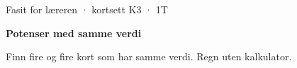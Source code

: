 \documentclass[11pt,a4paper]{article}
\begin{document}
\begin{minipage}[t]{0.8\linewidth}\vspace{0pt}
{\sffamily\small\color{dempet}Fasit for læreren · kortsett K3 · 1T}\par\vspace{0.25em}
{\fontsize{20}{24}\selectfont\bfseries Potenser med samme verdi}\par\vspace{0.5em}
Finn fire og fire kort som har samme verdi. Regn uten kalkulator.\par{}
\end{minipage}\hfill
\begin{minipage}[t]{0.15\linewidth}\vspace{0pt}\raggedleft
{}
\end{minipage}\par\vspace{0.8em}
\end{document}
